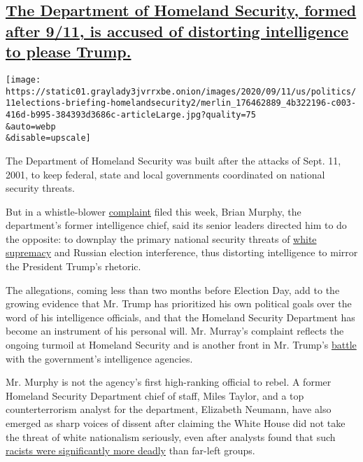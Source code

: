 \hypertarget{the-department-of-homeland-security-formed-after-911-is-accused-of-distorting-intelligence-to-please-trump}{%
\subsection{\texorpdfstring{\protect\hyperlink{the-department-of-homeland-security-formed-after-9-11-is-accused-of-distorting-intelligence-to-please-trump}{The
Department of Homeland Security, formed after 9/11, is accused of
distorting intelligence to please
Trump.}}{The Department of Homeland Security, formed after 9/11, is accused of distorting intelligence to please Trump.}}\label{the-department-of-homeland-security-formed-after-911-is-accused-of-distorting-intelligence-to-please-trump}}

\texttt{[image: https://static01.graylady3jvrrxbe.onion/images/2020/09/11/us/politics/11elections-briefing-homelandsecurity2/merlin\_176462889\_4b322196-c003-416d-b995-384393d3686c-articleLarge.jpg?quality=75\\\&auto=webp\\\&disable=upscale]}

The Department of Homeland Security was built after the attacks of Sept.
11, 2001, to keep federal, state and local governments coordinated on
national security threats.

But in a whistle-blower
\href{https://int.graylady3jvrrxbe.onion/data/documenttools/homeland-security-whistleblower/0819ec9ee29306a5/full.pdf}{complaint}
filed this week, Brian Murphy, the department's former intelligence
chief, said its senior leaders directed him to do the opposite: to
downplay the primary national security threats of
\href{https://www.nytimes3xbfgragh.onion/2020/09/01/us/politics/trump-homeland-security-extremism.html}{white
supremacy} and Russian election interference, thus distorting
intelligence to mirror the President Trump's rhetoric.

The allegations, coming less than two months before Election Day, add to
the growing evidence that Mr. Trump has prioritized his own political
goals over the word of his intelligence officials, and that the Homeland
Security Department has become an instrument of his personal will. Mr.
Murray's complaint reflects the ongoing turmoil at Homeland Security and
is another front in Mr. Trump's
\href{https://www.nytimes3xbfgragh.onion/2020/08/08/magazine/us-russia-intelligence.html}{battle}
with the government's intelligence agencies.

Mr. Murphy is not the agency's first high-ranking official to rebel. A
former Homeland Security Department chief of staff, Miles Taylor, and a
top counterterrorism analyst for the department, Elizabeth Neumann, have
also emerged as sharp voices of dissent after claiming the White House
did not take the threat of white nationalism seriously, even after
analysts found that such
\href{https://www.nytimes3xbfgragh.onion/2019/10/01/us/politics/white-supremacy-homeland-security.html}{racists
were significantly more deadly} than far-left groups.

